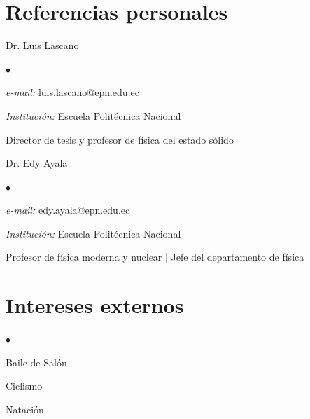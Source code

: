 \documentclass[margin,line]{res}
\newenvironment{list1}{
  \begin{list}{\ding{113}}{%
      \setlength{\itemsep}{0in}
      \setlength{\parsep}{0in} \setlength{\parskip}{0in}
      \setlength{\topsep}{0in} \setlength{\partopsep}{0in} 
      \setlength{\leftmargin}{0.17in}}}{\end{list}}
\newenvironment{list2}{
  \begin{list}{$\bullet$}{%
      \setlength{\itemsep}{0in}
      \setlength{\parsep}{0in} \setlength{\parskip}{0in}
      \setlength{\topsep}{0in} \setlength{\partopsep}{0in} 
      \setlength{\leftmargin}{0.2in}}}{\end{list}}
\begin{document}
\begin{resume}
\section{\sc Referencias personales}
 \begin{list1}
  \item[] Dr. Luis Lascano
  \begin{list2}
   \item {\it e-mail:} luis.lascano@epn.edu.ec
   \item {\it Institución:} Escuela Politécnica Nacional
   \item Director de tesis y profesor de física del estado sólido
  \end{list2}
 \end{list1}

 \begin{list1}
  \item[] Dr. Edy Ayala
  \begin{list2}
   \item {\it e-mail:} edy.ayala@epn.edu.ec
   \item {\it Institución:} Escuela Politécnica Nacional
   \item Profesor de física moderna y nuclear | Jefe del departamento de física
  \end{list2}
 \end{list1}
 



\section{\sc Intereses externos}
 \begin{list2}
  \item Baile de Salón
  \item Ciclismo
  \item Natación
 \end{list2}

\end{resume}
\end{document}
